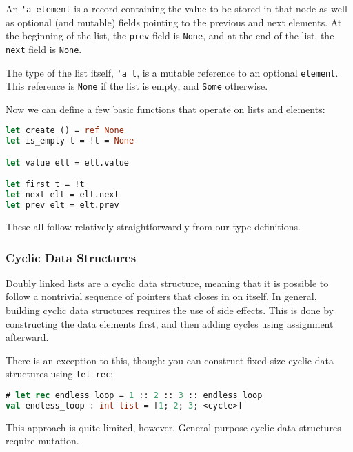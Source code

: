An \passthrough{\lstinline!'a element!} is a record containing the value
to be stored in that node as well as optional (and mutable) fields
pointing to the previous and next elements. At the beginning of the
list, the \passthrough{\lstinline!prev!} field is
\passthrough{\lstinline!None!}, and at the end of the list, the
\passthrough{\lstinline!next!} field is \passthrough{\lstinline!None!}.

The type of the list itself, \passthrough{\lstinline!'a t!}, is a
mutable reference to an optional \passthrough{\lstinline!element!}. This
reference is \passthrough{\lstinline!None!} if the list is empty, and
\passthrough{\lstinline!Some!} otherwise.

Now we can define a few basic functions that operate on lists and
elements:

\begin{lstlisting}[language=Caml]
let create () = ref None
let is_empty t = !t = None

let value elt = elt.value

let first t = !t
let next elt = elt.next
let prev elt = elt.prev
\end{lstlisting}

These all follow relatively straightforwardly from our type definitions.

\hypertarget{cyclic-data-structures}{%
\subsubsection{Cyclic Data Structures}\label{cyclic-data-structures}}

Doubly linked lists are a cyclic data structure, meaning that it is
possible to follow a nontrivial sequence of pointers that closes in on
itself. In general, building cyclic data structures requires the use of
side effects. This is done by constructing the data elements first, and
then adding cycles using assignment afterward.

There is an exception to this, though: you can construct fixed-size
cyclic data structures using \passthrough{\lstinline!let rec!}:

\begin{lstlisting}[language=Caml]
# let rec endless_loop = 1 :: 2 :: 3 :: endless_loop
val endless_loop : int list = [1; 2; 3; <cycle>]
\end{lstlisting}

This approach is quite limited, however. General-purpose cyclic data
structures require mutation.

